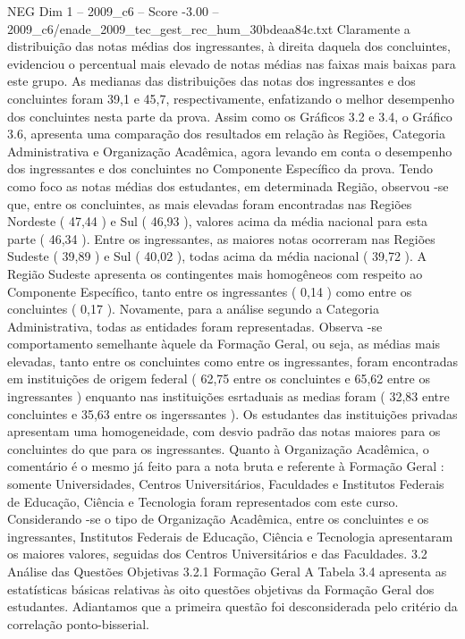 \begin{textsample}{NEG Dim 1 – 2009\_c6 – Score -3.00 – 2009\_c6/enade\_2009\_tec\_gest\_rec\_hum\_30bdeaa84c.txt}
Claramente a distribuição das notas médias dos ingressantes, à direita daquela dos concluintes, evidenciou o percentual mais elevado de notas médias nas faixas mais baixas para este grupo.
As medianas das distribuições das notas dos ingressantes e dos concluintes foram 39,1 e 45,7, respectivamente, enfatizando o melhor desempenho dos concluintes nesta parte da prova.
Assim como os Gráficos 3.2 e 3.4, o Gráfico 3.6, apresenta uma comparação dos resultados em relação às Regiões, Categoria Administrativa e Organização Acadêmica, agora levando em conta o desempenho dos ingressantes e dos concluintes no Componente Específico da prova.
Tendo como foco as notas médias dos estudantes, em determinada Região, observou -se que, entre os concluintes, as mais elevadas foram encontradas nas Regiões Nordeste ( 47,44 ) e Sul ( 46,93 ), valores acima da média nacional para esta parte ( 46,34 ).
Entre os ingressantes, as maiores notas ocorreram nas Regiões Sudeste ( 39,89 ) e Sul ( 40,02 ), todas acima da média nacional ( 39,72 ).
A Região Sudeste apresenta os contingentes mais homogêneos com respeito ao Componente Específico, tanto entre os ingressantes ( 0,14 ) como entre os concluintes ( 0,17 ).
Novamente, para a análise segundo a Categoria Administrativa, todas as entidades foram representadas.
Observa -se comportamento semelhante àquele da Formação Geral, ou seja, as médias mais elevadas, tanto entre os concluintes como entre os ingressantes, foram encontradas em instituições de origem federal ( 62,75 entre os concluintes e 65,62 entre os ingressantes ) enquanto nas instituições esrtaduais as medias foram ( 32,83 entre concluintes e 35,63 entre os ingerssantes ).
Os estudantes das instituições privadas apresentam uma homogeneidade, com desvio padrão das notas maiores para os concluintes do que para os ingressantes.
Quanto à Organização Acadêmica, o comentário é o mesmo já feito para a nota bruta e referente à Formação Geral : somente Universidades, Centros Universitários, Faculdades e Institutos Federais de Educação, Ciência e Tecnologia foram representados com este curso.
Considerando -se o tipo de Organização Acadêmica, entre os concluintes e os ingressantes, Institutos Federais de Educação, Ciência e Tecnologia apresentaram os maiores valores, seguidas dos Centros Universitários e das Faculdades. 3.2 Análise das Questões Objetivas 3.2.1 Formação Geral A Tabela 3.4 apresenta as estatísticas básicas relativas às oito questões objetivas da Formação Geral dos estudantes.
Adiantamos que a primeira questão foi desconsiderada pelo critério da correlação ponto-bisserial.

\end{textsample}
